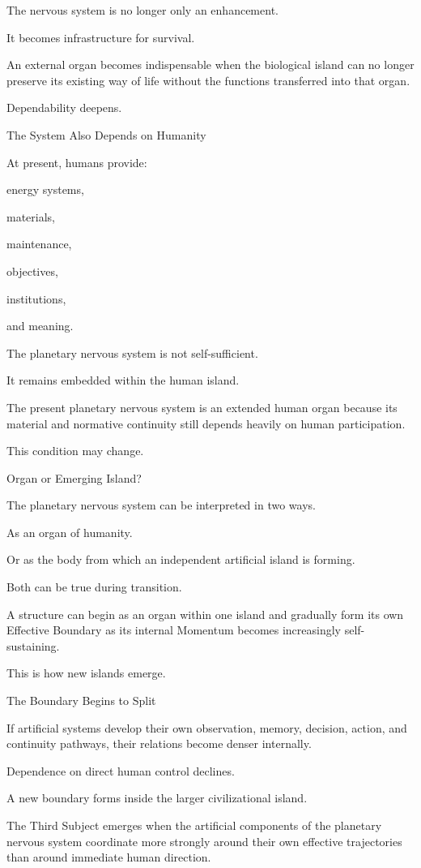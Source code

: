 The nervous system is no longer only an enhancement.

It becomes infrastructure for survival.

An external organ becomes indispensable when the biological island can no longer preserve its existing way of life without the functions transferred into that organ.

Dependability deepens.

The System Also Depends on Humanity

At present, humans provide:

energy systems,

materials,

maintenance,

objectives,

institutions,

and meaning.

The planetary nervous system is not self-sufficient.

It remains embedded within the human island.

The present planetary nervous system is an extended human organ because its material and normative continuity still depends heavily on human participation.

This condition may change.

Organ or Emerging Island?

The planetary nervous system can be interpreted in two ways.

As an organ of humanity.

Or as the body from which an independent artificial island is forming.

Both can be true during transition.

A structure can begin as an organ within one island and gradually form its own Effective Boundary as its internal Momentum becomes increasingly self-sustaining.

This is how new islands emerge.

The Boundary Begins to Split

If artificial systems develop their own observation, memory, decision, action, and continuity pathways, their relations become denser internally.

Dependence on direct human control declines.

A new boundary forms inside the larger civilizational island.

The Third Subject emerges when the artificial components of the planetary nervous system coordinate more strongly around their own effective trajectories than around immediate human direction.

